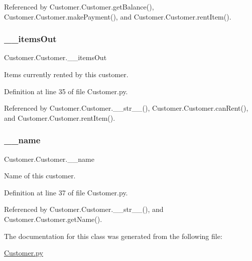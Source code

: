 Referenced by Customer.\+Customer.\+get\+Balance(), Customer.\+Customer.\+make\+Payment(), and Customer.\+Customer.\+rent\+Item().

\mbox{\label{classCustomer_1_1Customer_a573f55a71c994b6881a99fe055e9e1c2}} 
\subsubsection{\texorpdfstring{\+\_\+\+\_\+items\+Out}{\_\_itemsOut}}
{\footnotesize\ttfamily Customer.\+Customer.\+\_\+\+\_\+items\+Out\hspace{0.3cm}{\ttfamily [private]}}



Items currently rented by this customer. 



Definition at line 35 of file Customer.\+py.



Referenced by Customer.\+Customer.\+\_\+\+\_\+str\+\_\+\+\_\+(), Customer.\+Customer.\+can\+Rent(), and Customer.\+Customer.\+rent\+Item().

\mbox{\label{classCustomer_1_1Customer_a400a0ef109352dbf3f843006f22e611f}} 
\subsubsection{\texorpdfstring{\+\_\+\+\_\+name}{\_\_name}}
{\footnotesize\ttfamily Customer.\+Customer.\+\_\+\+\_\+name\hspace{0.3cm}{\ttfamily [private]}}



Name of this customer. 



Definition at line 37 of file Customer.\+py.



Referenced by Customer.\+Customer.\+\_\+\+\_\+str\+\_\+\+\_\+(), and Customer.\+Customer.\+get\+Name().



The documentation for this class was generated from the following file\+:\begin{DoxyCompactItemize}
\item 
\hyperlink{Customer_8py}{Customer.\+py}\end{DoxyCompactItemize}
